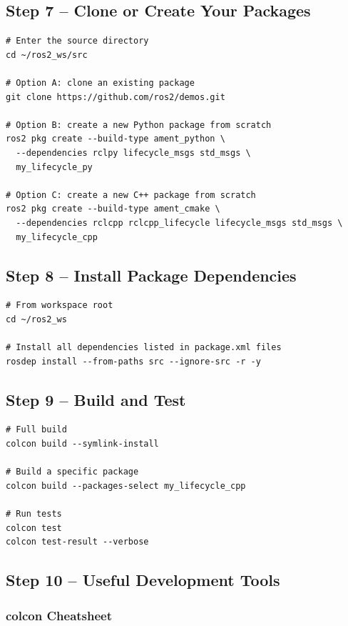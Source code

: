 \documentclass[11pt,a4paper]{csarticle}
\begin{document}
\subsection{Step 7 -- Clone or Create Your Packages}

\begin{lstlisting}[style=bash]
# Enter the source directory
cd ~/ros2_ws/src

# Option A: clone an existing package
git clone https://github.com/ros2/demos.git

# Option B: create a new Python package from scratch
ros2 pkg create --build-type ament_python \
  --dependencies rclpy lifecycle_msgs std_msgs \
  my_lifecycle_py

# Option C: create a new C++ package from scratch
ros2 pkg create --build-type ament_cmake \
  --dependencies rclcpp rclcpp_lifecycle lifecycle_msgs std_msgs \
  my_lifecycle_cpp
\end{lstlisting}

\subsection{Step 8 -- Install Package Dependencies}

\begin{lstlisting}[style=bash]
# From workspace root
cd ~/ros2_ws

# Install all dependencies listed in package.xml files
rosdep install --from-paths src --ignore-src -r -y
\end{lstlisting}

\subsection{Step 9 -- Build and Test}

\begin{lstlisting}[style=bash]
# Full build
colcon build --symlink-install

# Build a specific package
colcon build --packages-select my_lifecycle_cpp

# Run tests
colcon test
colcon test-result --verbose
\end{lstlisting}

\subsection{Step 10 -- Useful Development Tools}

\subsubsection{colcon Cheatsheet}
\end{document}

